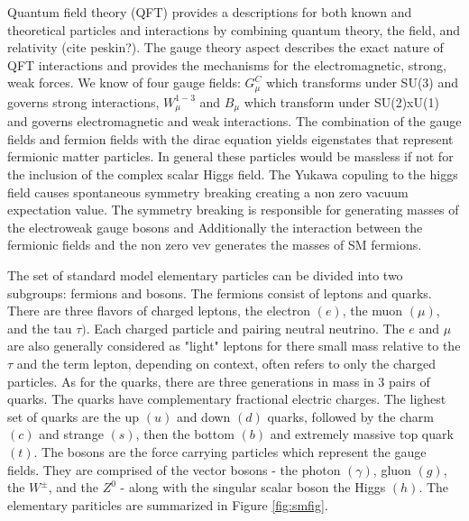 Quantum field theory (QFT) provides a descriptions for both known and theoretical particles and interactions by combining quantum theory, the field, and relativity (cite peskin?). The gauge theory aspect describes the exact nature of QFT interactions and provides the mechanisms for the electromagnetic, strong, weak forces.  We know of four gauge fields:  $G_\mu^C$ which transforms under SU(3) and governs strong interactions, $W^{1-3}_\mu$ and $B_\mu$ which transform under SU(2)xU(1) and governs electromagnetic and weak interactions. The combination of the gauge fields and fermion fields with the dirac equation yields eigenstates that represent fermionic matter particles. In general these particles would be massless if not for the inclusion of the complex scalar Higgs field. The Yukawa copuling to the higgs field causes spontaneous symmetry breaking  creating a non zero vacuum expectation value. The symmetry breaking is responsible for generating masses of the electroweak gauge bosons and Additionally the interaction between the fermionic fields and the non zero vev generates the masses of SM fermions.

The set of standard model elementary particles can be divided into two subgroups: fermions and bosons.  The fermions consist of leptons and quarks. There are three flavors of charged leptons, the electron $(e)$, the muon $(\mu)$, and the tau $\tau)$. Each charged particle and pairing neutral neutrino. The $e$ and $\mu$ are also generally considered as "light" leptons for there small mass relative to the $\tau$ and the term lepton, depending on context, often refers to only the charged particles. As for the quarks, there are three generations in mass in 3 pairs of quarks. The quarks have complementary fractional electric charges. The lighest set of quarks are the up $(u)$ and down $(d)$ quarks, followed by the charm $(c)$ and strange $(s)$, then the bottom $(b)$ and extremely massive top quark $(t)$.  The bosons are the force carrying particles which represent the gauge fields. They are comprised of the vector bosons - the photon $(\gamma)$, gluon $(g)$, the $W^\pm$, and the $Z^0$ - along with the singular scalar boson the Higgs $(h)$. The elementary pariticles are summarized in Figure \ref{fig:smfig}.






